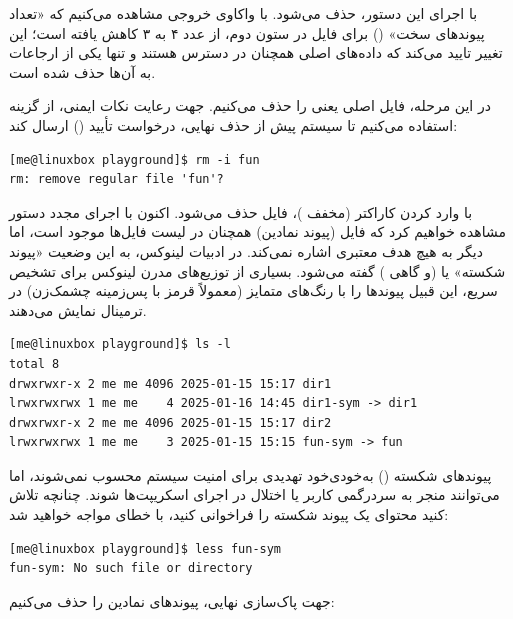 با اجرای این دستور،  حذف می‌شود. با واکاوی خروجی  مشاهده می‌کنیم که «تعداد پیوندهای سخت» () برای فایل  در ستون دوم، از عدد ۴ به ۳ کاهش یافته است؛ این تغییر تایید می‌کند که داده‌های اصلی همچنان در دسترس هستند و تنها یکی از ارجاعات به آن‌ها حذف شده است.

در این مرحله، فایل اصلی یعنی  را حذف می‌کنیم. جهت رعایت نکات ایمنی، از گزینه  استفاده می‌کنیم تا سیستم پیش از حذف نهایی، درخواست تأیید () ارسال کند:

\begin{latin}
\begin{lstlisting}
[me@linuxbox playground]$ rm -i fun
rm: remove regular file 'fun'?
\end{lstlisting}
\end{latin}

با وارد کردن کاراکتر  (مخفف )، فایل  حذف می‌شود. اکنون با اجرای مجدد دستور  مشاهده خواهیم کرد که فایل  (پیوند نمادین) همچنان در لیست فایل‌ها موجود است، اما دیگر به هیچ هدف معتبری اشاره نمی‌کند. در ادبیات لینوکس، به این وضعیت «پیوند شکسته» یا  (و گاهی ) گفته می‌شود. بسیاری از توزیع‌های مدرن لینوکس برای تشخیص سریع، این قبیل پیوندها را با رنگ‌های متمایز (معمولاً قرمز با پس‌زمینه چشمک‌زن) در ترمینال نمایش می‌دهند.

\begin{latin}
\begin{lstlisting}
[me@linuxbox playground]$ ls -l
total 8
drwxrwxr-x 2 me me 4096 2025-01-15 15:17 dir1
lrwxrwxrwx 1 me me    4 2025-01-16 14:45 dir1-sym -> dir1
drwxrwxr-x 2 me me 4096 2025-01-15 15:17 dir2
lrwxrwxrwx 1 me me    3 2025-01-15 15:15 fun-sym -> fun
\end{lstlisting}
\end{latin}

پیوندهای شکسته () به‌خودی‌خود تهدیدی برای امنیت سیستم محسوب نمی‌شوند، اما می‌توانند منجر به سردرگمی کاربر یا اختلال در اجرای اسکریپت‌ها شوند. چنانچه تلاش کنید محتوای یک پیوند شکسته را فراخوانی کنید، با خطای  مواجه خواهید شد:

\begin{latin}
\begin{lstlisting}
[me@linuxbox playground]$ less fun-sym
fun-sym: No such file or directory
\end{lstlisting}
\end{latin}

جهت پاک‌سازی نهایی، پیوندهای نمادین را حذف می‌کنیم:

